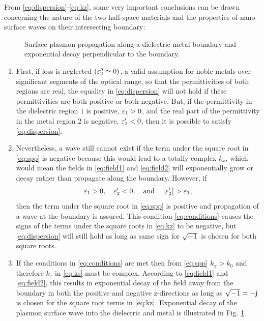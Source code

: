 \documentclass[11pt]{article}
\begin{document}
%
From \eqref{eq:dispersion}-\eqref{eq:kz}, some very important conclusions can be drawn concerning the nature of the two half-space materials and the properties of nano surface waves on their intersecting boundary:
%
\begin{figure}[b!]
  \centering
  \def\svgwidth{.75\linewidth}
  
  \caption{Surface plasmon propagation along a dielectric-metal boundary and exponential decay perpendicular to the boundary.}
  \label{fig:spp}
\end{figure}
%
\begin{enumerate}
  \item First, if loss is neglected $(\varepsilon_2'' \simeq 0)$, a valid assumption for noble metals over significant segments of the optical range, so that the permittivities of both regions are real, the equality in \eqref{eq:dispersion} will not hold if these permittivities are both positive or both negative. But, if the permittivity in the dielectric region $1$ is positive, $\varepsilon_1 > 0$, and the real part of the permittivity in the metal region $2$ is negative, $\varepsilon_2' < 0$, then it is possible to satisfy \eqref{eq:dispersion}.
  \item	Nevertheless, a wave still cannot exist if the term under the square root in \eqref{eq:spp} is negative because this would lead to a totally complex $k_x$, which would mean the fields in \eqref{eq:field1} and \eqref{eq:field2} will exponentially grow or decay rather than propagate along the boundary. However, if
  \begin{equation}
    \varepsilon_1 > 0, \quad		 \varepsilon_2' < 0, \quad   \text{and}  \quad \left| \varepsilon_2' \right| > \varepsilon_1,
    \label{eq:conditions}
  \end{equation}
  then the term under the square root in \eqref{eq:spp} is positive and propagation of a wave at the boundary is assured. This condition \eqref{eq:conditions} causes the signs of the terms under the square roots in \eqref{eq:kz} to be negative, but \eqref{eq:dispersion} will still hold as long as same sign for $\sqrt{-1}$ is chosen for both square roots.
  \item	If the conditions in \eqref{eq:conditions} are met then from \eqref{eq:spp} $k_x > k_0$ and therefore $k_z$ in \eqref{eq:ks} must be complex. According to \eqref{eq:field1} and \eqref{eq:field2}, this results in exponential decay of the field away from the boundary in both the positive and negative z-directions as long as $\sqrt{-1} = -\mathrm{j}\mkern1mu$ is chosen for the square root terms in \eqref{eq:kz}. Exponential decay of the plasmon surface wave into the dielectric and metal is illustrated in Fig. \ref{fig:spp}.

\end{enumerate}
\end{document}
